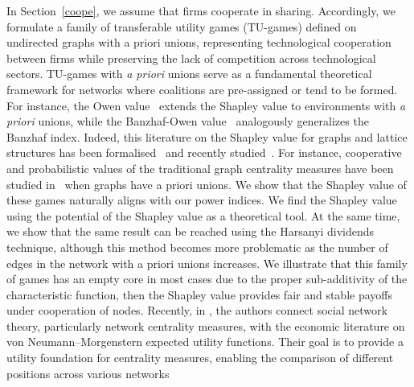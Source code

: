 \documentclass[preprint,11pt,authoryear]{elsarticle}
\theoremstyle{plain}
\begin{document}
In Section~\ref{coope}, we assume that firms cooperate in sharing. Accordingly, we formulate a family of transferable utility games (TU-games) defined on undirected graphs with a priori unions, representing technological cooperation between firms while preserving the lack of competition across technological sectors. TU-games with \emph{a priori} unions serve as a fundamental theoretical framework for networks where coalitions are pre-assigned or tend to be formed. For instance, the Owen value~\citep{owen1977values} extends the Shapley value to environments with \emph{a priori} unions, while the Banzhaf-Owen value~\citep{owen1981modification} analogously generalizes the Banzhaf index. Indeed, this literature on the Shapley value for graphs and lattice structures has been formalised~\citep{grabisch2006capacities, bilbao2012cooperative, grabisch1997k} and recently studied~\citep{khmelnitskaya2016shapley, hellman2018values, li2019myerson, li2020efficient, li2020myerson}. For instance, cooperative and probabilistic values of the traditional graph centrality measures have been studied in~\citep{szczepanski2014centrality} when graphs have a priori unions.
We show that the Shapley value of these games naturally aligns with our power indices. We find the Shapley value using the potential of the Shapley value as a theoretical tool. At the same time, we show that the same result can be reached using the Harsanyi dividends technique, although this method becomes more problematic as the number of edges in the network with a priori unions increases. We illustrate that this family of games has an empty core in most cases due to the proper sub-additivity of the characteristic function, then the Shapley value  provides fair and stable payoffs under cooperation of nodes. Recently, in \citep{van2022degree,van2024degree}, the authors connect social network theory, particularly network centrality measures, with the economic literature on von Neumann–Morgenstern expected utility functions. Their goal is to provide a utility foundation for centrality measures, enabling the comparison of different positions across various networks
\end{document}
